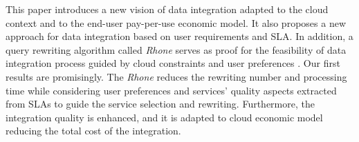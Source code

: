 This paper introduces a new vision of data integration adapted to the cloud context and to the end-user pay-per-use economic model. It also proposes a new approach for data integration based on user requirements and SLA. In addition, a query rewriting algorithm called \textit{Rhone} serves as proof for the feasibility of data integration process guided by cloud constraints and user preferences . Our first results are promisingly. The \textit{Rhone} reduces the rewriting number and processing time while considering user preferences and services' quality aspects extracted from SLAs to guide the service selection and rewriting. Furthermore, the integration quality is enhanced, and it is adapted to cloud economic model reducing the total cost of the integration.

